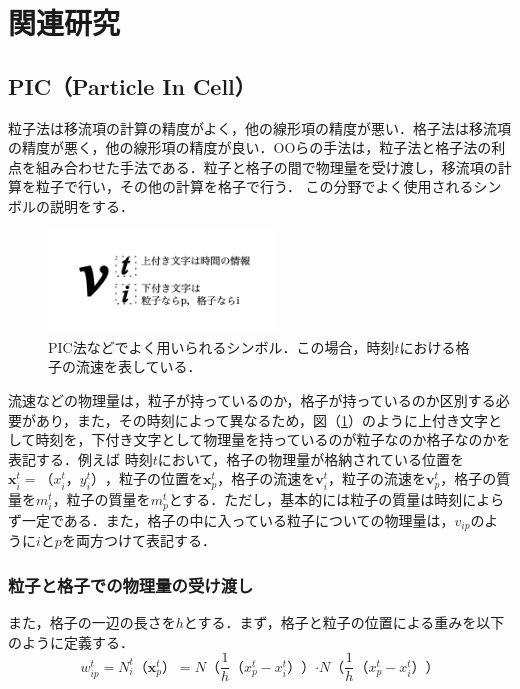 \documentclass[a4j,12pt]{jreport}
\begin{document}
\section{関連研究} \label{sec:reratedworks}
\subsection{PIC（Particle In Cell）} \label{subsec:PIC}
粒子法は移流項の計算の精度がよく，他の線形項の精度が悪い．格子法は移流項の精度が悪く，他の線形項の精度が良い．OOらの手法は，粒子法と格子法の利点を組み合わせた手法である．粒子と格子の間で物理量を受け渡し，移流項の計算を粒子で行い，その他の計算を格子で行う．
この分野でよく使用されるシンボルの説明をする．
\begin{figure}[htbp]
\begin{center}
\includegraphics[width=60mm]{exp_simbol.png}
\end{center}
\caption{PIC法などでよく用いられるシンボル．この場合，時刻$t$における格子の流速を表している．}
\label{fig:simbol}
\end{figure}

流速などの物理量は，粒子が持っているのか，格子が持っているのか区別する必要があり，また，その時刻によって異なるため，図（\ref{fig:simbol}）のように上付き文字として時刻を，下付き文字として物理量を持っているのが粒子なのか格子なのかを表記する．例えば
時刻$t$において，格子の物理量が格納されている位置を$\bm{x}^t_i = （x^t_i，y^t_i）$，粒子の位置を$\bm{x}^t_p$，格子の流速を$\bm{v}^t_i$，粒子の流速を$\bm{v}^t_p$，格子の質量を$m^t_i$，粒子の質量を$m^t_p$とする．ただし，基本的には粒子の質量は時刻によらず一定である．また，格子の中に入っている粒子についての物理量は，$v_{ip}$のように$iとp$を両方つけて表記する．
\subsubsection{粒子と格子での物理量の受け渡し} \label{subsec:P2GG2P}
また，格子の一辺の長さを$h$とする．まず，格子と粒子の位置による重みを以下のように定義する．
\begin{equation}\label{eq:weight}
w^t_{ip} = N^t_i（\bm{x}^t_p） = N（\frac{1}{h}（x^t_p - x^t_i））\boldsymbol{\cdot}N（\frac{1}{h}（x^t_p - x^t_i））
\end{equation} 
\end{document}
